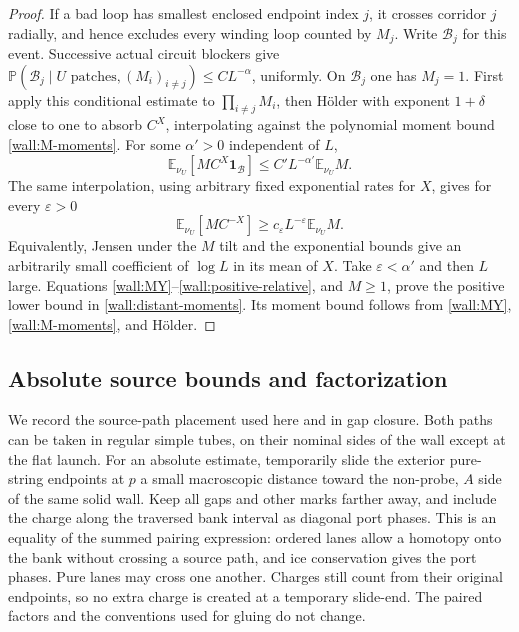 \begin{proof}
If a bad loop has smallest enclosed endpoint index $j$, it crosses
corridor $j$ radially, and hence excludes every winding loop counted
by $M_j$.  Write $\mathcal B_j$ for this event.  Successive actual
circuit blockers give
$\mathbb P(\mathcal B_j\mid U\text{ patches},(M_i)_{i\ne j})
\le CL^{-\alpha}$, uniformly.  On $\mathcal B_j$ one has $M_j=1$.
First apply this conditional estimate to
$\prod_{i\ne j}M_i$, then H\"older with exponent $1+\delta$ close
to one to absorb $C^X$, interpolating against the polynomial moment
bound \eqref{wall:M-moments}.  For some $\alpha'>0$ independent of $L$,
\begin{equation}
 \mathbb E_{\nu_U}[MC^X\mathbf1_{\mathcal B}]
       \le C'L^{-\alpha'}\mathbb E_{\nu_U}M.
 \label{wall:bad-relative}
\end{equation}
The same interpolation, using arbitrary fixed exponential rates for
$X$, gives for every $\varepsilon>0$
\begin{equation}
 \mathbb E_{\nu_U}[MC^{-X}]
       \ge c_\varepsilon L^{-\varepsilon}\mathbb E_{\nu_U}M.
 \label{wall:positive-relative}
\end{equation}
Equivalently, Jensen under the $M$ tilt and the exponential bounds
give an arbitrarily small coefficient of $\log L$ in its mean of $X$.
Take $\varepsilon<\alpha'$ and then $L$ large.  Equations
\eqref{wall:MY}--\eqref{wall:positive-relative}, and $M\ge1$, prove
the positive lower bound in \eqref{wall:distant-moments}.  Its moment
bound follows from \eqref{wall:MY}, \eqref{wall:M-moments}, and H\"older.
\end{proof}

\subsection{Absolute source bounds and factorization}

We record the source-path placement used here and in gap closure.
Both paths can be taken in regular simple tubes, on their nominal
sides of the wall except at the flat launch.  For an absolute estimate,
temporarily slide the exterior pure-string endpoints at $p$ a small
macroscopic distance toward the non-probe, $A$ side of the same solid
wall.  Keep all gaps and other marks farther away, and include the
charge along the traversed bank interval as diagonal port phases.
This is an equality of the summed pairing expression: ordered lanes
allow a homotopy onto the bank without crossing a source path, and
ice conservation gives the port phases.  Pure lanes may cross one
another.  Charges still count from their original endpoints, so no
extra charge is created at a temporary slide-end.  The paired factors
and the conventions used for gluing do not change.

